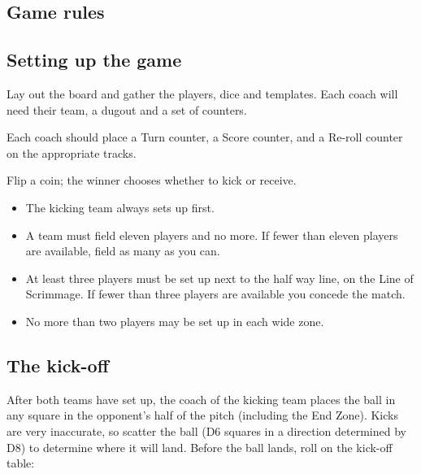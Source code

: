 \begin{multicols}{2}

\section{Game rules}

\subsection{Setting up the game}
\par Lay out the board and gather the players, dice and templates. Each coach will need their team, a dugout and a set of counters.
\par Each coach should place a Turn counter, a Score counter, and a Re-roll counter on the appropriate tracks.
\par Flip a coin; the winner chooses whether to kick or receive.

\begin{itemize}
\item The kicking team always sets up first.
\item A team must field eleven players and no more. If fewer than eleven players are available, field as many as you can.
\item At least three players must be set up next to the half way line, on the Line of Scrimmage. If fewer than three players are available you concede the match.
\item No more than two players may be set up in each wide zone.
\end{itemize}

\subsection{The kick-off}
\par After both teams have set up, the coach of the kicking team places the ball in any square in the opponent's half of the pitch (including the End Zone). Kicks are very inaccurate, so scatter the ball (D6 squares in a direction determined by D8) to determine where it will land. Before the ball lands, roll on the kick-off table:


\end{multicols}
